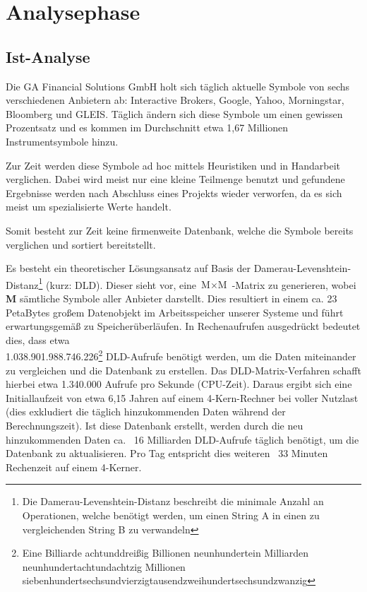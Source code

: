 \section{Analysephase}
\label{section:analysephase}
\subsection{Ist-Analyse}
Die GA Financial Solutions GmbH holt sich täglich aktuelle Symbole von sechs verschiedenen
Anbietern ab: Interactive Brokers, Google, Yahoo, Morningstar, Bloomberg und GLEIS.
Täglich ändern sich diese Symbole um einen gewissen Prozentsatz und es kommen im 
Durchschnitt etwa 1,67 Millionen Instrumentsymbole hinzu.\par

Zur Zeit werden diese Symbole ad hoc mittels Heuristiken und in Handarbeit verglichen.
Dabei wird meist nur eine kleine Teilmenge benutzt und gefundene Ergebnisse werden
nach Abschluss eines Projekts wieder verworfen, da es sich meist um spezialisierte Werte handelt.\par

Somit besteht zur Zeit keine firmenweite Datenbank, welche die Symbole
bereits verglichen und sortiert bereitstellt.\par

Es besteht ein theoretischer Lösungsansatz auf Basis der 
Damerau-Levenshtein-Distanz\footnote{Die Damerau-Levenshtein-Distanz
beschreibt die minimale Anzahl an Operationen, welche benötigt werden, um einen 
String A in einen zu vergleichenden String B zu verwandeln} (kurz: DLD). 
Dieser sieht vor, eine $\text{M} \times \text{M}$ -Matrix zu generieren, wobei \textbf{M} sämtliche Symbole aller
Anbieter darstellt. Dies resultiert in einem ca. 23 PetaBytes großem Datenobjekt
im Arbeitsspeicher unserer Systeme und führt erwartungsgemäß zu Speicherüberläufen.
In Rechenaufrufen ausgedrückt bedeutet dies, dass etwa \\
1.038.901.988.746.226\footnote{Eine Billiarde achtunddreißig Billionen neunhundertein Milliarden neunhundertachtundachtzig Millionen siebenhundertsechsundvierzigtausendzweihundertsechsundzwanzig} DLD-Aufrufe benötigt werden, um die Daten miteinander
zu vergleichen und die Datenbank zu erstellen. Das DLD-Matrix-Verfahren schafft hierbei 
etwa 1.340.000 Aufrufe pro Sekunde (CPU-Zeit).
Daraus ergibt sich eine Initiallaufzeit von etwa 6,15 Jahren auf einem 4-Kern-Rechner bei voller Nutzlast (dies exkludiert die täglich hinzukommenden Daten
während der Berechnungszeit). Ist diese Datenbank erstellt, werden durch die neu
hinzukommenden Daten ca. ~16 Milliarden DLD-Aufrufe täglich benötigt, um die
Datenbank zu aktualisieren. Pro Tag entspricht dies weiteren ~33 Minuten Rechenzeit auf
einem 4-Kerner.\par

